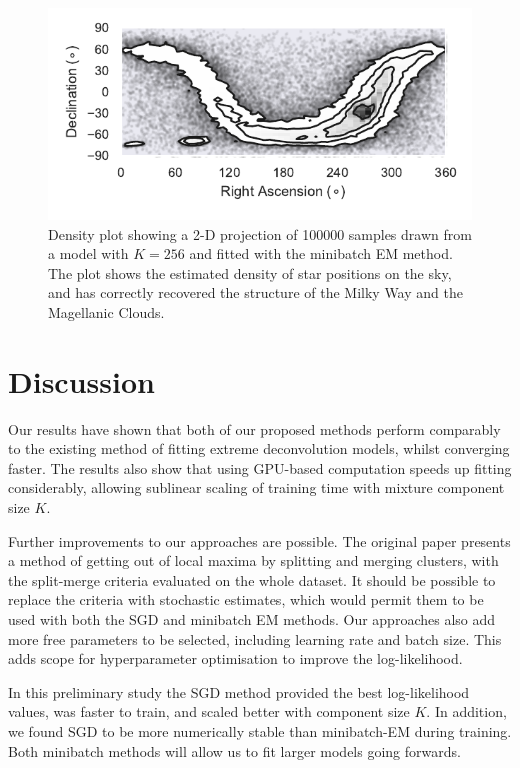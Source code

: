\documentclass{article}
\begin{document}
\begin{figure}
  \centering
  \includegraphics{figures/density.pdf}
  \caption{Density plot showing a 2-D projection of 100000 samples drawn from a model with $K=256$ and fitted with the minibatch EM method.
  The plot shows the estimated density of star positions on the sky, and has correctly recovered the structure of the Milky Way and the Magellanic Clouds.}
  \label{fig:projection}
\end{figure}

\section{Discussion}

Our results have shown that both of our proposed methods perform comparably to the existing method of fitting extreme deconvolution models, whilst converging faster.
The results also show that using GPU-based computation speeds up fitting considerably, allowing sublinear scaling of training time with mixture component size $K$. 

Further improvements to our approaches are possible.
The original paper presents a method of getting out of local maxima by splitting and merging clusters, with the split-merge criteria evaluated on the whole dataset.
It should be possible to replace the criteria with stochastic estimates, which would permit them to be used with both the SGD and minibatch EM methods.
Our approaches also add more free parameters to be selected, including learning rate and batch size.
This adds scope for hyperparameter optimisation to improve the log-likelihood.

In this preliminary study the SGD method provided the best log-likelihood values, was faster to train, and scaled better with component size $K$.
In addition, we found SGD to be more numerically stable than minibatch-EM during training.
Both minibatch methods will allow us to fit larger models going forwards.
\end{document}
